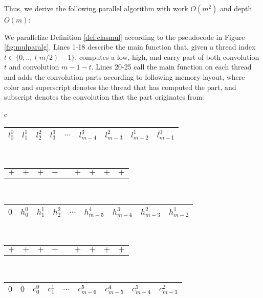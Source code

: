 Thus, we derive the following parallel algorithm with work $O(m^2)$ and depth
$O(m)$:

\begin{definition}\label{def:convmul}
  We parallelize Definition \ref{def:clasmul} according to the pseudocode in
  Figure \ref{fig:mulparalg}. Lines 1-18 describe the main function that, given
  a thread index ${t\in \{0,..,(m/2)-1\}}$, computes a low, high, and carry part
  of both convolution $t$ and convolution $m-1-t$. Lines 20-25 call the main
  function on each thread and adds the convolution parts according to following
  memory layout, where color and superscript denotes the thread that has
  computed the part, and subscript denotes the convolution that the part
  originates from:
\begin{center}
  \small
  \begin{tabular}{c}
    \begin{tabular}{|C{0.8cm}|C{0.8cm}|C{0.8cm}|C{0.8cm}|C{0.5cm}|C{0.8cm}|C{0.8cm}|C{0.8cm}|C{0.8cm}|}
      \hline
      \red $l^0_0$ & \blue $l^1_1$ & \green $l^2_2$ & \brown $l^3_3$ & $\ldots$ & \brown $l^3_{m-4}$ & \green $l^2_{m-3}$ & \blue $l^1_{m-2}$ & \red $l^0_{m-1}$\\
      \hline
    \end{tabular}\\[-0.3ex]
    \begin{tabular}{C{0.81cm}C{0.81cm}C{0.81cm}C{0.81cm}C{0.51cm}C{0.81cm}C{0.81cm}C{0.81cm}C{0.81cm}}
      $+$ & $+$ & $+$ & $+$ &  & $+$ & $+$ & $+$ & $+$
    \end{tabular}\\[-0.3ex]
    \begin{tabular}{|C{0.8cm}|C{0.8cm}|C{0.8cm}|C{0.8cm}|C{0.5cm}|C{0.8cm}|C{0.8cm}|C{0.8cm}|C{0.8cm}|}
      \hline
      $0$ & \red $h^0_0$ & \blue $h^1_1$ & \green $h^2_2$ & $\ldots$ & \color{magenta} $h^{4}_{m-5}$ & \brown $h^{3}_{m-4}$ & \green $h^{2}_{m-3}$ & \blue $h^1_{m-2}$\\
      \hline
    \end{tabular}\\[-0.3ex]
    \begin{tabular}{C{0.81cm}C{0.81cm}C{0.81cm}C{0.81cm}C{0.51cm}C{0.81cm}C{0.81cm}C{0.81cm}C{0.81cm}}
      $+$ & $+$ & $+$ & $+$ &  & $+$ & $+$ & $+$ & $+$
    \end{tabular}\\[-0.3ex]
    \begin{tabular}{|C{0.8cm}|C{0.8cm}|C{0.8cm}|C{0.8cm}|C{0.5cm}|C{0.8cm}|C{0.8cm}|C{0.8cm}|C{0.8cm}|}
      \hline
      $0$ & $0$ & \red $c^{0}_0$ & \blue $c^{1}_1$ & $\ldots$ & \color{cyan} $c^{5}_{m-6}$ & \color{magenta} $c^{4}_{m-5}$ & \brown $c^{3}_{m-4}$ & \green $c^{2}_{m-3}$\\
      \hline
    \end{tabular}
  \end{tabular}
\end{center}
\end{definition}
\bigskip

